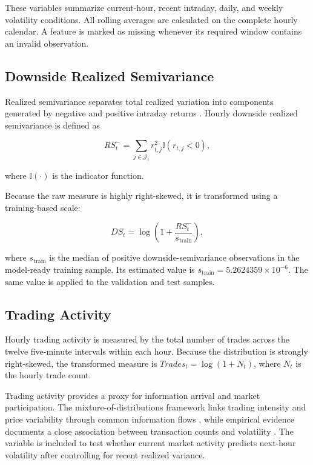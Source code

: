 These variables summarize current-hour, recent intraday,
daily, and weekly volatility conditions. All rolling averages
are calculated on the complete hourly calendar. A feature is
marked as missing whenever its required window contains an
invalid observation.

\subsection{Downside Realized Semivariance}

Realized semivariance separates total realized variation into
components generated by negative and positive intraday returns
\citep{barndorffnielsen2010}. Hourly downside realized
semivariance is defined as

\begin{equation}
RS^{-}_t
=
\sum_{j \in \mathcal{J}_t}
r_{t,j}^{2}
\mathbb{I}(r_{t,j}<0),
\label{eq:downside-semivariance}
\end{equation}

where \(\mathbb{I}(\cdot)\) is the indicator function.

Because the raw measure is highly right-skewed, it is
transformed using a training-based scale:

\begin{equation}
DS_t
=
\log
\left(
1+
\frac{RS^{-}_t}{s_{\mathrm{train}}}
\right),
\label{eq:downside-transform}
\end{equation}

where \(s_{\mathrm{train}}\) is the median of positive
downside-semivariance observations in the model-ready training
sample. Its estimated value is
\(s_{\mathrm{train}}=5.2624359\times10^{-6}\). The same value
is applied to the validation and test samples.

\subsection{Trading Activity}

Hourly trading activity is measured by the total number of
trades across the twelve five-minute intervals within each
hour. Because the distribution is strongly right-skewed, the
transformed measure is
\(Trades_t=\log(1+N_t)\), where \(N_t\) is the hourly trade
count.

Trading activity provides a proxy for information arrival and
market participation. The mixture-of-distributions framework
links trading intensity and price variability through common
information flows \citep{clark1973}, while empirical evidence
documents a close association between transaction counts and
volatility \citep{jones1994}. The variable is included to test
whether current market activity predicts next-hour volatility
after controlling for recent realized variance.

